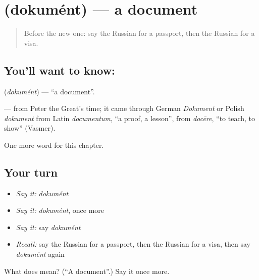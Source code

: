 \section[\texorpdfstring{\ru{документ} (dokumént)}{документ (dokumént)}]{ (dokumént) — a document}

\label{lesson:RU-C247-dokument}



\begin{quote}
Before the new one: say the Russian for a passport, then the Russian for a visa.
\end{quote}

\subsection*{You'll want to know: }
\textbf{} (\emph{dokumént}) — \textquotedblleft{}a document\textquotedblright{}.

\begin{cousinweb}
\textbf{} — from Peter the Great's time; it came through German \emph{Dokument} or Polish \emph{dokument} from Latin \emph{documentum}, \textquotedblleft{}a proof, a lesson\textquotedblright{}, from \emph{docēre}, \textquotedblleft{}to teach, to show\textquotedblright{} (Vasmer).
\end{cousinweb}

\begin{grammarlens}[title={What you've built}]
One more word for this chapter.
\end{grammarlens}

\subsection*{Your turn}
\begin{itemize}
\raggedright
  \item \emph{Say it:} \emph{dokumént}
  \item \emph{Say it:} \emph{dokumént}, once more
  \item \emph{Say it:} say \emph{dokumént}
  \item \emph{Recall:} say the Russian for a passport, then the Russian for a visa, then say \emph{dokumént} again
\end{itemize}

\begin{tcolorbox}[breakable,colback=teal!4,colframe=teal!35!black,title={Before you move on}]
What does  mean? (\textquotedblleft{}A document\textquotedblright{}.) Say it once more.
\end{tcolorbox}
